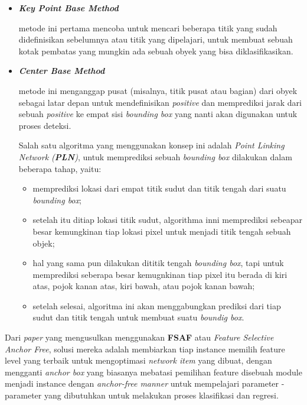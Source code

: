 \documentclass[a4paper]{article}
\begin{document}
\begin{enumerate}
    \begin{itemize}
        \item \textbf{\textit{Key Point Base Method}}

            metode ini pertama mencoba untuk mencari beberapa titik yang sudah didefinisikan sebelumnya atau titik yang dipelajari, untuk membuat sebuah kotak pembatas yang mungkin ada sebuah obyek yang bisa diklasifikasikan\autocite{DBLP:journals/corr/abs-1904-03797}.

        \item \textbf{\textit{Center Base Method}}

            metode ini menganggap pusat (misalnya, titik pusat atau bagian) dari obyek sebagai latar depan untuk mendefinisikan \textit{positive} dan memprediksi jarak dari sebuah \textit{positive} ke empat sisi \textit{bounding box} yang nanti akan digunakan untuk proses deteksi\autocite{Zhang_2020_CVPR}.


            Salah satu algoritma yang menggunakan konsep ini adalah \textit{Point Linking Network (\textbf{PLN})}, untuk memprediksi sebuah \textit{bounding box} dilakukan dalam beberapa tahap, yaitu:

            \begin{itemize}
                \item memprediksi lokasi dari empat titik sudut dan titik tengah dari suatu \textit{bounding box};
                \item setelah itu ditiap lokasi titik sudut, algorithma inni memprediksi sebeapar besar kemungkinan tiap lokasi pixel untuk menjadi titik tengah sebuah objek;
                \item hal yang sama pun dilakukan dititik tengah \textit{bounding box}, tapi untuk memprediksi seberapa besar kemugnkinan tiap pixel itu berada di kiri atas, pojok kanan atas, kiri bawah, atau pojok kanan bawah;
                \item setelah selesai, algoritma ini akan menggabungkan prediksi dari tiap sudut dan titik tengah untuk membuat suatu \textit{boundig box}\autocite{DBLP:journals/corr/abs-1808-01244}.
            \end{itemize}

    \end{itemize}


    Dari \textit{paper} yang mengusulkan menggunakan \textbf{FSAF} atau \textit{Feature Selective Anchor Free}, solusi mereka adalah membiarkan tiap instance memilih feature level yang terbaik untuk mengoptimasi \textit{network item} yang dibuat, dengan mengganti \textit{anchor box} yang biasanya mebatasi pemilihan feature disebuah module menjadi instance dengan \textit{anchor-free manner} untuk mempelajari parameter - parameter yang dibutuhkan untuk melakukan proses klasifikasi dan regresi\autocite{Zhu_2019_CVPR}.


\end{enumerate}
\end{document}
